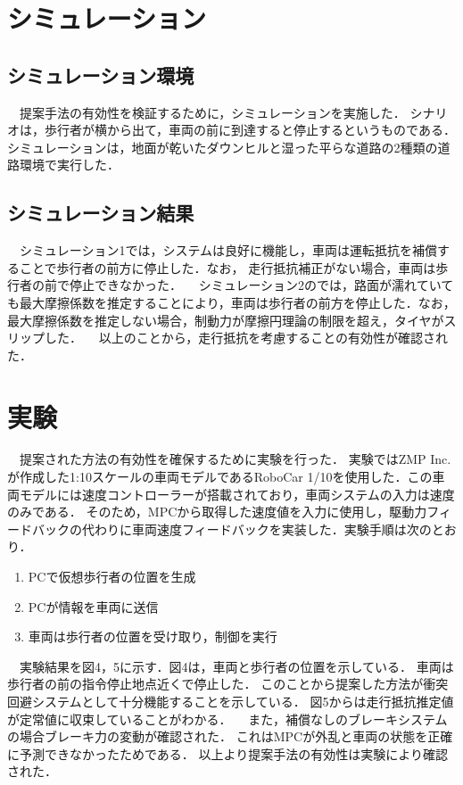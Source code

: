 \section{シミュレーション}
\subsection{シミュレーション環境}
　提案手法の有効性を検証するために，シミュレーションを実施した． シナリオは，歩行者が横から出て，車両の前に到達すると停止するというものである．シミュレーションは，地面が乾いたダウンヒルと湿った平らな道路の2種類の道路環境で実行した．
\subsection{シミュレーション結果}
　シミュレーション1では，システムは良好に機能し，車両は運転抵抗を補償することで歩行者の前方に停止した．なお， 走行抵抗補正がない場合，車両は歩行者の前で停止できなかった．
　シミュレーション2のでは，路面が濡れていても最大摩擦係数を推定することにより，車両は歩行者の前方を停止した．なお，最大摩擦係数を推定しない場合，制動力が摩擦円理論の制限を超え，タイヤがスリップした．
　以上のことから，走行抵抗を考慮することの有効性が確認された．

\section{実験}
　提案された方法の有効性を確保するために実験を行った． 実験ではZMP Inc.が作成した1:10スケールの車両モデルであるRoboCar 1/10を使用した．この車両モデルには速度コントローラーが搭載されており，車両システムの入力は速度のみである． そのため，MPCから取得した速度値を入力に使用し，駆動力フィードバックの代わりに車両速度フィードバックを実装した．実験手順は次のとおり．
\begin{enumerate}
    \item PCで仮想歩行者の位置を生成
    \item PCが情報を車両に送信
    \item 車両は歩行者の位置を受け取り，制御を実行
  \end{enumerate}

　実験結果を図4，5に示す．図4は，車両と歩行者の位置を示している． 車両は歩行者の前の指令停止地点近くで停止した． このことから提案した方法が衝突回避システムとして十分機能することを示している． 図5からは走行抵抗推定値が定常値に収束していることがわかる．
　また，補償なしのブレーキシステムの場合ブレーキ力の変動が確認された． これはMPCが外乱と車両の状態を正確に予測できなかったためである． 以上より提案手法の有効性は実験により確認された．

